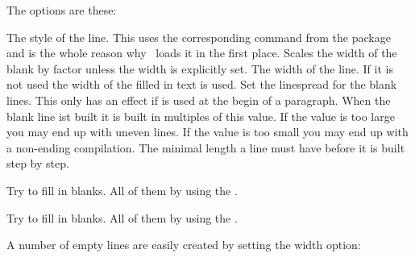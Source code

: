 \documentclass[load-preamble+]{cnltx-doc}
\begin{document}
The options are these:
\begin{options}
    The style of the line.  This uses the corresponding command from the
     package and is the whole reason why \ExSheets\ loads it in the
    first place.
    Scales the width of the blank by factor  unless the width is
    explicitly set.
  \Default
    The width of the line.  If it is not used the width of the filled in text
    is used.
    Set the linespread for the blank lines.  This only has an effect if
     is used at the begin of a paragraph.
  \Default{1pt}
    When the blank line ist built it is built in multiples
    of this value.  If the value is too large you may end up with uneven
    lines.  If the value is too small you may end up with a non-ending
    compilation.
  \Default{2em}
    The minimal length a line must have before it is built
    step by step.
\end{options}
\begin{example}
  \begin{question}
    Try to fill in  blanks. All of them
     by using the 
    .
  \end{question}
  \begin{solution}[print]
    Try to fill in  blanks. All of them
     by using the 
    .
  \end{solution}
\end{example}
A number of empty lines are easily created by setting the width option:
\begin{example}
  \blank[width=4.8\linewidth,linespread=1.5]{}
\end{example}
\end{document}
